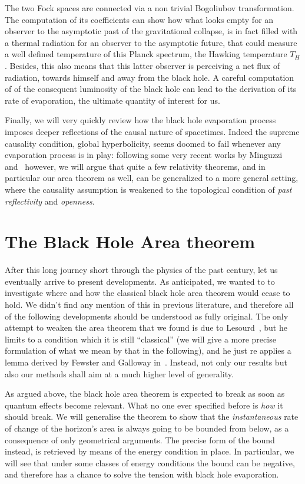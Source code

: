 The two Fock spaces are connected via a non trivial Bogoliubov transformation. The computation of its coefficients can show how what looks empty for an observer to the asymptotic past of the gravitational collapse, is in fact filled with a thermal radiation for an observer to the asymptotic future, that could measure a well defined temperature of this Planck spectrum, the Hawking temperature \(T_H\). Besides, this also means that this latter observer is perceiving a net flux of radiation, towards himself and away from the black hole. A careful computation of of the consequent luminosity of the black hole can lead to the derivation of its rate of evaporation, the ultimate quantity of interest for us.

Finally, we will very quickly review how the black hole evaporation process imposes deeper reflections of the causal nature of spacetimes. Indeed the supreme causality condition, global hyperbolicity, seems doomed to fail whenever any evaporation process is in play: following some very recent works by Minguzzi~\cite[]{minguzzi2020gravitational} and~\cite[]{minguzzi2019lorentzian} however, we will argue that quite a few relativity theorems, and in particular our area theorem as well, can be generalized to a more general setting, where the causality assumption is weakened to the topological condition of \emph{past reflectivity} and \emph{openness}.

\section{The Black Hole Area theorem}

After this long journey short through the physics of the past century, let us eventually arrive to present developments.
As anticipated, we wanted to to investigate where and how the classical black hole area theorem would cease to hold. We didn't find any mention of this in previous literature, and therefore all of the following developments should be understood as fully original. The only attempt to weaken the area theorem that we found is due to Lesourd~\cite[]{lesourd2018remark}, but he limits to a condition which it is still ``classical'' (we will give a more precise formulation of what we mean by that in the following), and he just re applies a lemma derived by Fewster and Galloway in~\cite[]{fewster2011singularity}. Instead, not only our results but also our methods shall aim at a much higher level of generality.

As argued above, the black hole area theorem is expected to break as soon as quantum effects become relevant. What no one ever specified before is \emph{how} it should break. We will generalise the theorem to show that the \emph{instantaneous} rate of change of the horizon's area is always going to be bounded from below, as a consequence of only geometrical arguments. The precise form of the bound instead, is retrieved by means of the energy condition in place. In particular, we will see that under some classes of energy conditions the bound can be negative, and therefore has a chance to solve the tension with black hole evaporation.

